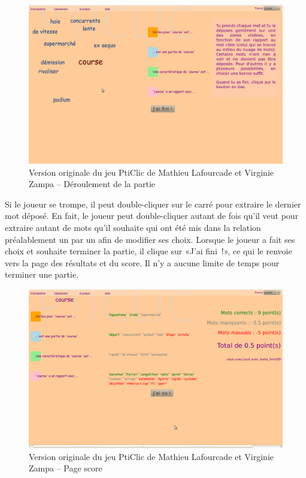 \documentclass[a4paper,11pt,french]{article}
\begin{document}
\begin{figure}[h!]
  \centering
\includegraphics[width=14cm]{img/PtiClicJeu2.png}
 \caption{Version originale du jeu PtiClic de Mathieu Lafourcade et Virginie Zampa -- Déroulement de la partie}
\end{figure}


Si le joueur se trompe, il peut double-cliquer sur le carré pour extraire le dernier mot déposé. En fait, le joueur peut double-cliquer
autant de fois qu'il veut pour extraire autant de mots qu'il souhaite qui ont été mis dans la relation préalablement un par un afin de modifier ses choix. Lorsque le
joueur a fait ses choix et souhaite terminer la partie, il clique sur «J'ai fini~!», ce qui le renvoie vers la page des résultats et du
score. Il n'y a aucune limite de temps pour terminer une partie.

\begin{figure}[h!]
  \centering
\includegraphics[width=14cm]{img/PtiClicResultats.png}
 \caption{Version originale du jeu PtiClic de Mathieu Lafourcade et Virginie Zampa -- Page score}
\end{figure}
\end{document}
